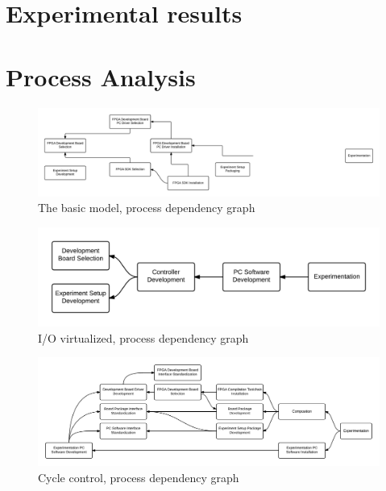 \documentclass[openright]{template/uva-bachelor-thesis}
\begin{document}
\chapter{Experimental results}

\appendix

\chapter{Process Analysis}

\begin{figure}[h]
\centering
\includegraphics[width=\textwidth]{img/processes-dependencies-basic}
\caption{The basic model, process dependency graph}
\label{fig:dependencies-basic}
\end{figure}

\begin{figure}[h]
\centering
\includegraphics[width=\textwidth]{img/processes-dependencies-inout}
\caption{I/O virtualized, process dependency graph}
\label{fig:dependencies-inout}
\end{figure}

\begin{landscape}
\begin{figure}
\centering
\includegraphics[width=\hsize]{img/processes-dependencies-control}
\caption{Cycle control, process dependency graph}
\label{fig:dependencies-control}
\end{figure}
\end{landscape}
\end{document}
